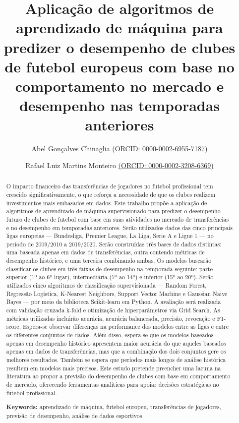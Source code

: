 \documentclass[a4paper]{article}
\title{Aplicação de algoritmos de aprendizado de máquina para predizer o desempenho de clubes de futebol europeus com base no comportamento no mercado e desempenho nas temporadas anteriores}
\author[1,2]{Abel Gonçalves Chinaglia \href{https://orcid.org/0000-0002-6955-7187}{(ORCID: 0000-0002-6955-7187)}}
\author[1,2]{Rafael Luiz Martins Monteiro \href{https://orcid.org/0000-0002-3208-6369}{(ORCID: 0000-0002-3208-6369)}}
\affil[1]{Faculdade de Medicina de Ribeirão Preto, Universidade de São Paulo, Brasil}
\affil[2]{Escola de Educação Física e Esportes de Ribeirão Preto, Universidade de São Paulo, Brasil}
\date{} %
\theoremstyle{plain}
\theoremstyle{definition}
\begin{document}
\maketitle
	
\begin{abstract}
O impacto financeiro das transferências de jogadores no futebol profissional tem crescido significativamente, o que reforça a necessidade de que os clubes realizem investimentos mais embasados em dados. Este trabalho propõe a aplicação de algoritmos de aprendizado de máquina supervisionado para predizer o desempenho futuro de clubes de futebol com base em suas atividades no mercado de transferências e no desempenho em temporadas anteriores. Serão utilizados dados das cinco principais ligas europeias — Bundesliga, Premier League, La Liga, Serie A e Ligue 1 — no período de 2009/2010 a 2019/2020. Serão construídas três bases de dados distintas: uma baseada apenas em dados de transferências, outra contendo métricas de desempenho histórico, e uma terceira combinando ambas. Os modelos buscarão classificar os clubes em três faixas de desempenho na temporada seguinte: parte superior (1º ao 6º lugar), intermediária (7º ao 14º) e inferior (15º ao 20º). Serão utilizados cinco algoritmos de classificação supervisionada — Random Forest, Regressão Logística, K-Nearest Neighbors, Support Vector Machine e Gaussian Naive Bayes — por meio da biblioteca Scikit-learn em Python. A avaliação será realizada com validação cruzada k-fold e otimização de hiperparâmetros via Grid Search. As métricas utilizadas incluirão acurácia, acurácia balanceada, precisão, revocação e F1-score. Espera-se observar diferenças na performance dos modelos entre as ligas e entre os diferentes conjuntos de dados. Além disso, espera-se que os modelos baseados apenas em desempenho histórico apresentem maior acurácia do que aqueles baseados apenas em dados de transferências, mas que a combinação dos dois conjuntos gere os melhores resultados. Também se espera que períodos mais longos de análise histórica resultem em modelos mais precisos. Este estudo pretende preencher uma lacuna na literatura ao propor a previsão do desempenho de clubes com base em comportamento de mercado, oferecendo ferramentas analíticas para apoiar decisões estratégicas no futebol profissional.


\noindent\textbf{Keywords:} aprendizado de máquina, futebol europeu, transferências de jogadores, previsão de desempenho, análise de dados esportivos
\newline

\end{abstract}
\end{document}
